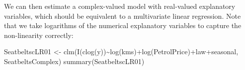 \documentclass[
]{book}
\newenvironment{Shaded}{\begin{snugshade}}{\end{snugshade}}
\newcommand{\FunctionTok}[1]{\textcolor[rgb]{0.00,0.00,0.00}{#1}}
\newcommand{\NormalTok}[1]{#1}
\newcommand{\OtherTok}[1]{\textcolor[rgb]{0.56,0.35,0.01}{#1}}
\newcommand{\SpecialCharTok}[1]{\textcolor[rgb]{0.00,0.00,0.00}{#1}}
\begin{document}
We can then estimate a complex-valued model with real-valued explanatory variables, which should be equivalent to a multivariate linear regression. Note that we take logarithms of the numerical explanatory variables to capture the non-linearity correctly:

\begin{Shaded}
\begin{Highlighting}[]
\NormalTok{SeatbeltscLR01 }\OtherTok{\textless{}{-}}
    \FunctionTok{clm}\NormalTok{(}\FunctionTok{I}\NormalTok{(}\FunctionTok{clog}\NormalTok{(y))}\SpecialCharTok{\textasciitilde{}}\FunctionTok{log}\NormalTok{(kms)}\SpecialCharTok{+}\FunctionTok{log}\NormalTok{(PetrolPrice)}\SpecialCharTok{+}\NormalTok{law}\SpecialCharTok{+}\NormalTok{seasonal,}
\NormalTok{        SeatbeltsComplex)}
\FunctionTok{summary}\NormalTok{(SeatbeltscLR01)}
\end{Highlighting}
\end{Shaded}
\end{document}
